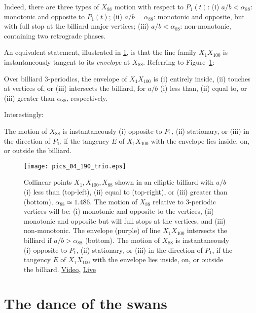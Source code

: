 Indeed, there are three types of $X_{88}$ motion with respect to $P_1(t)$: (i) $a/b<\alpha_{88}$: monotonic and opposite to $P_1(t)$; (ii) $a/b=\alpha_{88}$: monotonic and opposite, but with full stop at the billiard major vertices; (iii) $a/b<\alpha_{88}$: non-monotonic, containing two retrograde phases.

An equivalent statement, illustrated in \cref{fig:04-x88-envelope}, is that the line family $X_1 X_{100}$ is instantaneously tangent to its {\em envelope} at $X_{88}$. Referring to Figure~\ref{fig:04-x88-envelope}:

\begin{proposition}
Over billiard 3-periodics, the envelope of $X_1 X_{100}$ is (i) entirely inside, (ii) touches at vertices of, or (iii) intersects the billiard, for $a/b$ (i) less than, (ii) equal to, or (iii) greater than $\alpha_{88}$, respectively. 
\label{prop:04-x88-env}
\end{proposition}

Interestingly:

\begin{proposition}
The motion of $X_{88}$ is instantaneously (i) opposite to $P_1$, (ii) stationary, or (iii) in the direction of $P_1$, if the tangency $E$ of $X_1 X_{100}$ with the envelope lies inside, on, or outside the billiard.
\label{prop:04-x88-envelope}
\end{proposition}

\begin{figure}
    \centering
    \texttt{[image: pics\_04\_190\_trio.eps]}
     \caption{Collinear points $X_1,X_{100},X_{88}$ shown in an elliptic billiard with $a/b$ (i) less than (top-left), (ii) equal to (top-right), or (iii) greater than (bottom), $\alpha_{88}{\simeq}1.486$. The motion of $X_{88}$ relative to 3-periodic vertices will be: (i) monotonic and opposite to the vertices, (ii) monotonic and opposite but will full stops at the vertices, and (iii) non-monotonic. The envelope (purple) of line  $X_1 X_{100}$ intersects the billiard if $a/b>\alpha_{88}$ (bottom). The motion of $X_{88}$ is instantaneously (i) opposite to $P_1$, (ii) stationary, or (iii) in the direction of $P_1$, if the tangency $E$ of $X_1 X_{100}$ with the envelope lies inside, on, or outside the billiard. \href{https://youtu.be/nJLp--JjDZU}{Video}, \href{https://bit.ly/3hKicgM}{Live}}
    \label{fig:04-x88-envelope}
\end{figure}

\section{The dance of the swans}

